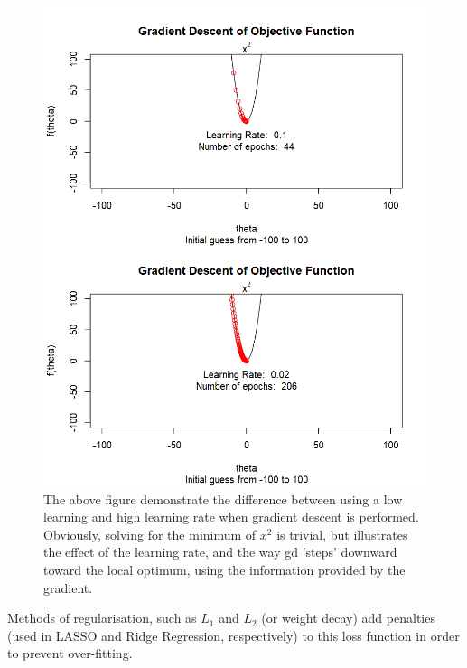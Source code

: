 \begin{figure}[H]
\centering
\includegraphics[width=\textwidth]{figs/gd_lr.png}
%
\caption[Illustration of gradient descent.]{The above figure demonstrate the difference between using a low learning and high learning rate when gradient descent is performed. Obviously, solving for the minimum of $x^2$ is trivial, but illustrates the effect of the learning rate, and the way \gls{gd} 'steps' downward toward the local optimum, using the information provided by the gradient.} 
\label{fig:gd_lr} %
\end{figure}


Methods of regularisation, such as $L_1$ and $L_2$ (or weight decay) add penalties (used in LASSO and Ridge Regression, respectively) to this loss function in order to prevent over-fitting. 

